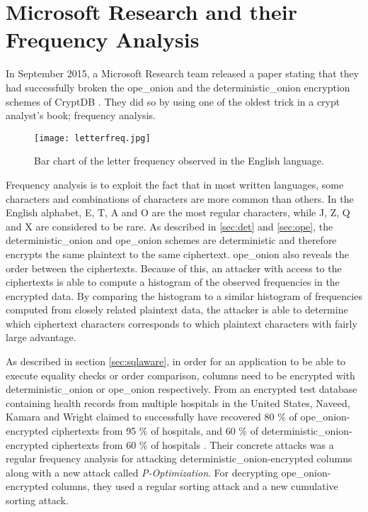 \section{Microsoft Research and their Frequency Analysis}

In September 2015, a Microsoft Research team released a paper stating that they had successfully broken the \gls{ope_onion} and the \gls{deterministic_onion} encryption schemes of CryptDB \cite{microsoft_cryptdb}. They did so by using one of the oldest trick in a crypt analyst's book; frequency analysis.

\begin{wrapfigure}[14]{r}[1pt]{7.2cm}
\centering
\texttt{[image: letterfreq.jpg]}
\caption{Bar chart of the letter frequency observed in the English language.}
\label{fig:letter_freq}
\end{wrapfigure}
Frequency analysis is to exploit the fact that in most written languages, some characters and combinations of characters are more common than others. In the English alphabet, E, T, A and O are the most regular characters, while J, Z, Q and X are considered to be rare. As described in \ref{sec:det} and \ref{sec:ope}, the \gls{deterministic_onion} and \gls{ope_onion} schemes are deterministic and therefore encrypts the same plaintext to the same ciphertext. \gls{ope_onion} also reveals the order between the ciphertexts. Because of this, an attacker with access to the ciphertexts is able to compute a histogram of the observed frequencies in the encrypted data. By comparing the histogram to a similar histogram of frequencies computed from closely related plaintext data, the attacker is able to determine which ciphertext characters corresponds to which plaintext characters with fairly large advantage.


As described in section \ref{sec:sqlaware}, in order for an application to be able to execute equality checks or order comparison, columns need to be encrypted with \gls{deterministic_onion} or \gls{ope_onion} respectively. From an encrypted test database containing health records from multiple hospitals in the United States, Naveed, Kamara and Wright claimed to successfully have recovered 80 \% of \gls{ope_onion}-encrypted ciphertexts from 95 \% of hospitals, and 60 \% of \gls{deterministic_onion}-encrypted ciphertexts from 60 \% of hospitals \cite{microsoft_cryptdb}. Their concrete attacks was a regular frequency analysis for attacking \gls{deterministic_onion}-encrypted columns along with a new attack called \emph{P-Optimization}. For decrypting \gls{ope_onion}-encrypted columns, they used a regular sorting attack and a new cumulative sorting attack.

